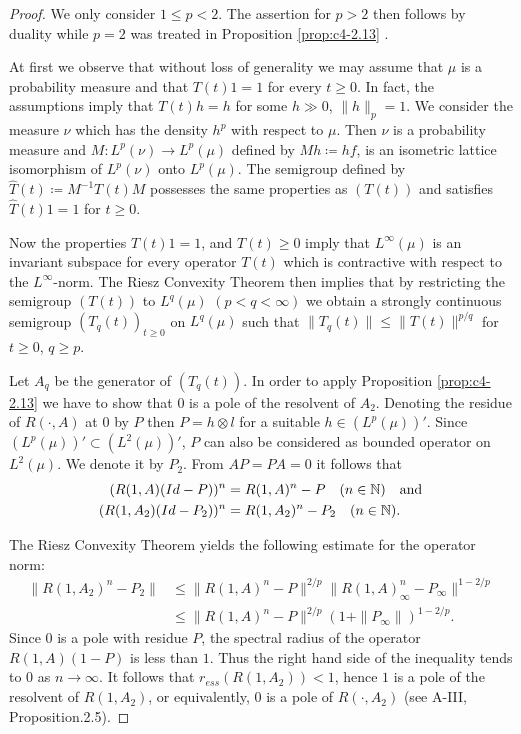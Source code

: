 \begin{proof}
We only consider $1 \leq p < 2$.
The assertion for $p > 2$ then follows by duality while $p = 2$ was treated in Proposition \ref{prop:c4-2.13} .

At first we observe that without loss of generality we may assume that $\mu$ is a probability measure and that $T(t)1 = 1$ for every $t \geq 0$.
In fact, the assumptions imply that $T(t)h = h$ for some $h \gg 0$, $\|h\|_{p} = 1$.
We consider the measure $\nu$ which has the density $h^{p}$ with respect to $\mu$.
Then $\nu$ is a probability measure and 
$M \colon L^{p}(\nu) \to L^{p}(\mu)$ defined by $Mh \coloneqq hf$, is an isometric lattice isomorphism of $L^{p}(\nu)$ onto $L^{p}(\mu)$.
The semigroup defined by $\widehat{T}(t) \coloneqq M^{-1}T(t)M$ possesses the same properties as $(T(t))$ and satisfies $\widehat{T}(t)1 = 1$ for $t \geq 0$.

Now the properties $T(t)1 = 1$, and $T(t) \geq 0$ imply that $L^{\infty}(\mu)$ is an invariant subspace for every operator $T(t)$ which is contractive with respect to the $L^{\infty}$-norm.
The Riesz Convexity Theorem \citet[VI.10.11]{dunfordschwartz:1958} then implies that by restricting the semigroup $(T(t))$ to $L^{q}(\mu)$ $(p < q < \infty)$ we obtain a strongly continuous semigroup $(T_{q}(t))_{t \geq 0}$ on $L^{q}(\mu)$ such that $\|T_{q}(t)\| \leq \|T(t)\|^{p/q}$ for $t \geq 0$, $q \geq p$.

Let $A_{q}$ be the generator of $(T_{q}(t))$.
In order to apply Proposition \ref{prop:c4-2.13} we have to show that $0$ is a pole of the resolvent of $A_{2}$.
Denoting the residue of $R(\cdot,A)$ at $0$ by $P$ then $P = h \otimes l$ for a suitable $h \in (L^{p}(\mu))'$.
Since $(L^{p}(\mu))' \subset (L^{2}(\mu))'$, $P$ can also be considered as bounded operator on $L^{2}(\mu)$.
We denote it by $P_{2}$.
From $AP = PA = 0$ it follows that
\begin{align*}
(R(1,A)(Id-P))^{n} &= R(1,A)^{n} - P \quad (n \in \mathbb{N}) \quad \text{and} \\
(R(1,A_{2})(Id-P_{2}))^{n} &= R(1,A_{2})^{n} - P_{2} \quad (n \in \mathbb{N}).
\end{align*}

The Riesz Convexity Theorem yields the following estimate for the operator norm:
\begin{align*}
\|R(1,A_{2})^{n} - P_{2}\| &\leq \|R(1,A)^{n} - P\|^{2/p}\|R(1,A)_{\infty}^{n} - P_{\infty}\|^{1-2/p} \\
&\leq \|R(1,A)^{n} - P\|^{2/p}(1 + \|P_{\infty}\|)^{1-2/p}.
\end{align*}
Since $0$ is a pole with residue $P$, the spectral radius of the operator $R(1,A)(1-P)$ is less than $1$.
Thus the right hand side of the inequality tends to $0$ as $n \to \infty$.
It follows that $r_{ess}(R(1,A_{2})) < 1$, hence $1$ is a pole of the resolvent of $R(1,A_{2})$, or equivalently, $0$ is a pole of $R(\cdot,A_{2})$ (see A-III, Proposition.2.5).


\end{proof}
